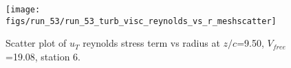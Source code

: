 \begin{figure}[H]
\centering
\texttt{[image: figs/run\_53/run\_53\_turb\_visc\_reynolds\_vs\_r\_meshscatter]}
\caption{Scatter plot of $
u_T$ reynolds stress term vs radius at $z/c$=9.50, $V_{free}$=19.08, station 6.}
\label{fig:run_53_turb_visc_reynolds_vs_r_meshscatter}
\end{figure}


